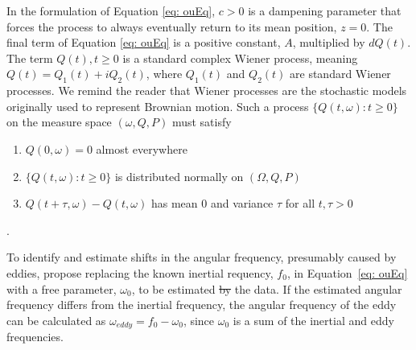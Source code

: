 \documentclass{stat572Style}
\newcommand{\vmdel}[1]{\sout{#1}}
\newcommand{\vmadd}[1]{\textbf{\color{red}{#1}}}
\begin{document}
 In the formulation of Equation \eqref{eq: ouEq}, $c > 0$ is a dampening parameter that forces the process to always eventually return to its mean position, $z = 0$.  
 The final term of Equation \eqref{eq: ouEq} is a positive constant, $A$, multiplied by $dQ(t)$.  The term $Q(t), t \geq 0$ is a standard complex Wiener process,  meaning $Q(t) = Q_{1}(t) + i Q_{2}(t)$, where $Q_{1}(t)$ and $Q_{2}(t)$ are standard Wiener processes.
 We remind the reader that Wiener processes are the stochastic models originally used to represent Brownian motion. 
  Such a process $\{Q(t, \omega): t \geq 0\}$ on the measure space $(\omega, Q, P)$ must satisfy
\begin{enumerate}
\item $Q(0, \omega) = 0$ almost everywhere
\item $\{Q(t, \omega): t \geq 0\}$ is distributed normally on $(\Omega,Q, P)$
\item $Q(t + \tau, \omega) - Q(t, \omega)$ has mean 0 and variance $\tau$ for all $t, \tau > 0$
\end{enumerate}
\citep{Hida1980}. 

To identify and estimate shifts in the angular frequency, presumably caused by eddies, \citet{Sykulski2016} propose replacing the known inertial requency, $f_{0}$,  in Equation~\eqref{eq: ouEq} with  a free parameter, $\omega_{0}$, to be estimated \vmdel{by} \vmadd{from} the data. 
If the estimated angular frequency differs from the inertial frequency, the angular frequency of the eddy can be calculated as $\omega_{eddy} = f_{0} - \omega_{0}$, since $\omega_{0}$ is a sum of the inertial and eddy frequencies.
\end{document}
